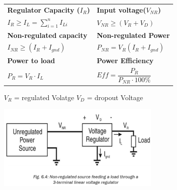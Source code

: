 \begin{tabular}{l l}
    \textbf{Regulator Capacity ($I_R$)}     & \textbf{Input voltage($V_{NR}$)} \\
    $ I_R \geq I_L = \sum_{i=1}^{n}I_{Li} $ & $ V_{NR} \geq  (V_R + V_D)$\\
    \textbf{Non-regulated capacity}         & \textbf{Non-regulated Power} \\
    $ I_{NR} \geq (I_R + I_{gnd}) $         & $ P_{NR}=V_R(I_R + I_{gnd}) $ \\
    \textbf{Power to load}                  & \textbf{Power Efficiency} \\
    $ P_R = V_R \cdot I_L $                 & $ Eff = \dfrac{P_R}{P_{NR}\cdot 100\%} $\\   
\end{tabular}
\begin{minipage}{2cm}
    {\scriptsize
    $V_R$ = regulated Volatge\newline
    $ V_D$ = dropout Voltage \newline  } 
\end{minipage}
\begin{minipage}{5cm}
    \includegraphics[width=8cm]{images/NRPowerSource.png}
\end{minipage}
\clearpage
